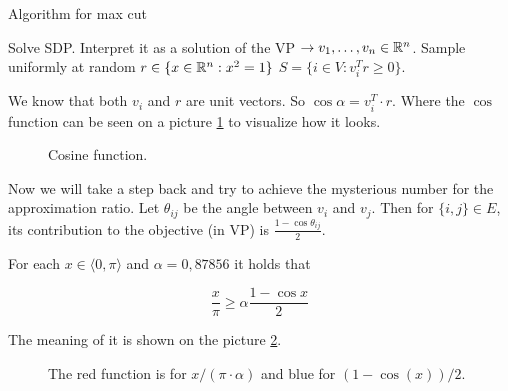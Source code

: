 \begin{algorithm}
	\caption{Algorithm for max cut}
	\begin{algorithmic}[1]
		\State Solve SDP.
		\State Interpret it as a solution of the VP $\to v_{1}, \dots, v_{n} \in \mathbb{R}^n$.
		\State Sample uniformly at random $r \in \{x \in \mathbb{R}^n : x^2 = 1\}$
		\State \Return $S = \{i \in V : v_{i}^T r \geq 0\}$.
	\end{algorithmic}
\end{algorithm}

We know that both $v_{i}$ and $r$ are unit vectors. So $\cos \alpha = v_{i}^T \cdot r$. Where the $\cos$ function can be seen on a picture \ref{cos} to visualize how it looks.

\begin{figure}[!ht]\centering
	\caption{Cosine function.}
	\label{cos}
\end{figure}

Now we will take a step back and try to achieve the mysterious number for the approximation ratio. Let $\theta_{ij}$ be the angle between $v_{i}$ and $v_{j}$. Then for $\{i,j\} \in E$, its contribution to the objective (in VP) is $\frac{1 - \cos \theta_{ij}}{2}$.

\begin{lemma}[no proof]
	For each $x \in \langle 0, \pi \rangle$ and $\alpha = 0,87856$ it holds that
	
	$$
	\frac{x}{\pi} \geq \alpha \frac{1 - \cos x}{2}
	$$
\end{lemma}

The meaning of it is shown on the picture \ref{meaning}.

\begin{figure}[!ht]\centering
	\caption{The \textcolor{myred}{red} function is for $x/(\pi \cdot \alpha)$ and \textcolor{myblue}{blue} for $(1 - \cos(x)) /2$.}
	\label{meaning}
\end{figure}

